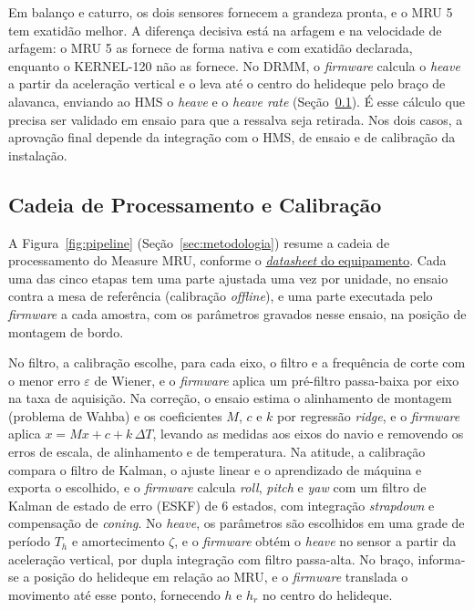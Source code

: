 \documentclass[a4paper, 12pt]{article}
\newcommand{\urldatasheet}{https://measureoffshore.com}
\begin{document}
{\vspace{-0.5\baselineskip}\par}

Em balanço e caturro, os dois sensores fornecem a grandeza pronta, e o MRU 5 tem exatidão melhor. A diferença decisiva está na arfagem e na velocidade de arfagem: o MRU 5 as fornece de forma nativa e com exatidão declarada, enquanto o KERNEL-120 não as fornece. No DRMM, o \textit{firmware} calcula o \textit{heave} a partir da aceleração vertical e o leva até o centro do helideque pelo braço de alavanca, enviando ao HMS o \textit{heave} e o \textit{heave rate} (Seção~\ref{sec:pipeline}). É esse cálculo que precisa ser validado em ensaio para que a ressalva seja retirada. Nos dois casos, a aprovação final depende da integração com o HMS, de ensaio e de calibração da instalação.

\subsection{Cadeia de Processamento e Calibração}\label{sec:pipeline}

A Figura~\ref{fig:pipeline} (Seção~\ref{sec:metodologia}) resume a cadeia de processamento do Measure MRU, conforme o \href{\urldatasheet}{\textit{datasheet} do equipamento}. Cada uma das cinco etapas tem uma parte ajustada uma vez por unidade, no ensaio contra a mesa de referência (calibração \textit{offline}), e uma parte executada pelo \textit{firmware} a cada amostra, com os parâmetros gravados nesse ensaio, na posição de montagem de bordo.

No filtro, a calibração escolhe, para cada eixo, o filtro e a frequência de corte com o menor erro $\varepsilon$ de Wiener, e o \textit{firmware} aplica um pré-filtro passa-baixa por eixo na taxa de aquisição. Na correção, o ensaio estima o alinhamento de montagem (problema de Wahba) e os coeficientes $M$, $c$ e $k$ por regressão \textit{ridge}, e o \textit{firmware} aplica $x = M x + c + k\,\Delta T$, levando as medidas aos eixos do navio e removendo os erros de escala, de alinhamento e de temperatura. Na atitude, a calibração compara o filtro de Kalman, o ajuste linear e o aprendizado de máquina e exporta o escolhido, e o \textit{firmware} calcula \textit{roll}, \textit{pitch} e \textit{yaw} com um filtro de Kalman de estado de erro (ESKF) de 6 estados, com integração \textit{strapdown} e compensação de \textit{coning}. No \textit{heave}, os parâmetros são escolhidos em uma grade de período $T_h$ e amortecimento $\zeta$, e o \textit{firmware} obtém o \textit{heave} no sensor a partir da aceleração vertical, por dupla integração com filtro passa-alta. No braço, informa-se a posição do helideque em relação ao MRU, e o \textit{firmware} translada o movimento até esse ponto, fornecendo $h$ e $h_r$ no centro do helideque.
\end{document}

